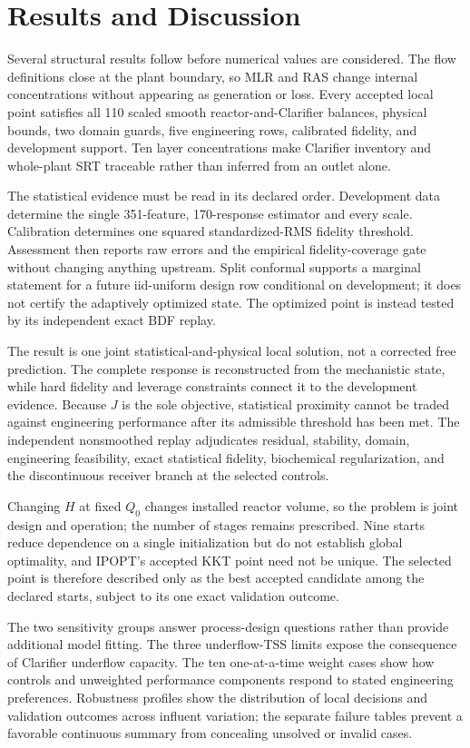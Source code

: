 \documentclass[a4paper,fleqn]{cas-sc}
\begin{document}
\section{Results and Discussion}

Several structural results follow before numerical values are considered. The flow definitions close at the plant boundary, so MLR and RAS change internal concentrations without appearing as generation or loss. Every accepted local point satisfies all 110 scaled smooth reactor-and-Clarifier balances, physical bounds, two domain guards, five engineering rows, calibrated fidelity, and development support. Ten layer concentrations make Clarifier inventory and whole-plant SRT traceable rather than inferred from an outlet alone.

The statistical evidence must be read in its declared order. Development data determine the single 351-feature, 170-response estimator and every scale. Calibration determines one squared standardized-RMS fidelity threshold. Assessment then reports raw errors and the empirical fidelity-coverage gate without changing anything upstream. Split conformal supports a marginal statement for a future iid-uniform design row conditional on development; it does not certify the adaptively optimized state. The optimized point is instead tested by its independent exact BDF replay.

The result is one joint statistical-and-physical local solution, not a corrected free prediction. The complete response is reconstructed from the mechanistic state, while hard fidelity and leverage constraints connect it to the development evidence. Because $J$ is the sole objective, statistical proximity cannot be traded against engineering performance after its admissible threshold has been met. The independent nonsmoothed replay adjudicates residual, stability, domain, engineering feasibility, exact statistical fidelity, biochemical regularization, and the discontinuous receiver branch at the selected controls.

Changing $H$ at fixed $Q_0$ changes installed reactor volume, so the problem is joint design and operation; the number of stages remains prescribed. Nine starts reduce dependence on a single initialization but do not establish global optimality, and IPOPT's accepted KKT point need not be unique. The selected point is therefore described only as the best accepted candidate among the declared starts, subject to its one exact validation outcome.

The two sensitivity groups answer process-design questions rather than provide additional model fitting. The three underflow-TSS limits expose the consequence of Clarifier underflow capacity. The ten one-at-a-time weight cases show how controls and unweighted performance components respond to stated engineering preferences. Robustness profiles show the distribution of local decisions and validation outcomes across influent variation; the separate failure tables prevent a favorable continuous summary from concealing unsolved or invalid cases.
\end{document}
